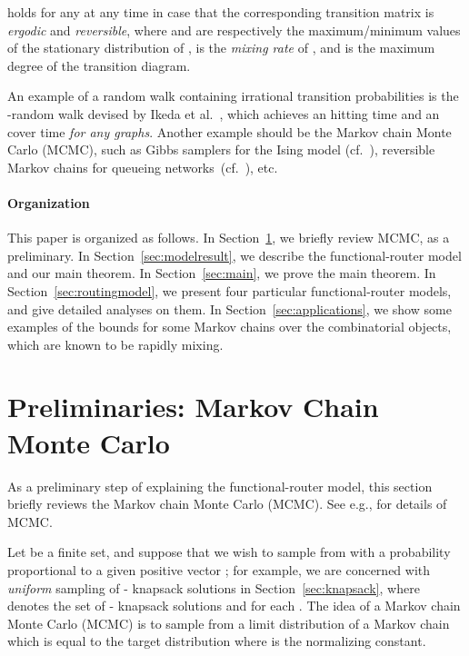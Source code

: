 \documentclass[letter, 11pt]{article}
\newcommand{\1}{\mbox{1}\hspace{-0.25em}\mbox{l}}
\begin{document}
   holds for any  at any time  
   in case that the corresponding transition matrix  is {\em ergodic} and {\em reversible}, 
  where 
   and  are respectively the maximum/minimum values of the stationary distribution  of , 
   is the {\em mixing rate} of , and 
   is the maximum degree of the transition diagram. 

An example of a random walk containing irrational transition probabilities is 
  the -random walk devised by Ikeda et al.~\cite{IKY09}, 
  which achieves an  hitting time and an  cover time {\em for any graphs}. 
 Another example should be the Markov chain Monte Carlo (MCMC), 
   such as Gibbs samplers for the Ising model (cf.\ \cite{Sinclair93, PW96}), 
   reversible Markov chains for queueing networks~(cf.~\cite{KM08}), etc.  


\paragraph{Organization}
 This paper is organized as follows.  
 In Section~\ref{sec:MCMC}, 
   we briefly review MCMC, 
    as a preliminary. 
 In Section~\ref{sec:modelresult}, 
  we describe the functional-router model and our main theorem.   
 In Section~\ref{sec:main}, 
   we prove the main theorem. In Section~\ref{sec:routingmodel}, 
   we present four particular functional-router models, and give detailed analyses on them. 
 In Section~\ref{sec:applications}, 
   we show some examples of the bounds 
    for some Markov chains over the combinatorial objects, 
   which are known to be rapidly mixing. 


\section{Preliminaries: Markov Chain Monte Carlo}\label{sec:MCMC}
As a preliminary step of explaining the functional-router model, this section briefly reviews the Markov chain Monte Carlo (MCMC). 
 See e.g., \cite{Sinclair93, LPW08, MT06} for details of MCMC. 

 Let  be a finite set, and 
  suppose that we wish to sample from  with a probability 
  proportional to a given positive vector ; 
  for example, we are concerned with {\em uniform} sampling of - knapsack solutions in Section~\ref{sec:knapsack}, 
   where  denotes the set of - knapsack solutions and  for each . 
The idea of a Markov chain Monte Carlo (MCMC) is 
   to sample from a limit distribution of a Markov chain 
   which is equal to the target distribution  
   where  is the normalizing constant. 
\end{document}
